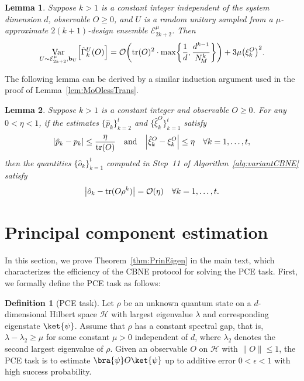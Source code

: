 \documentclass[aps,prl,twocolumn,nofootinbib,superscriptaddress,10pt]{revtex4-2}
\let\originalleft\left
\let\originalright\right
\renewcommand{\left}{\mathopen{}\mathclose\bgroup\originalleft}
\renewcommand{\right}{\aftergroup\egroup\originalright}
\DeclareMathOperator{\Var}{Var}
\DeclareMathOperator{\Tr}{tr}
\newcommand{\bigo}[1]{\mathcal{O}\left(#1\right)}
\theoremstyle{plain}
\newtheorem{lemma}{Lemma}
\theoremstyle{definition}
\newtheorem{defn}{Definition}
\newcommand{\caH}{\mathcal{H}}
\newcommand{\eref}[1]{Eq.~\textup{(\ref{#1})}}
\newcommand{\lref}[1]{Lemma~\ref{#1}}
\newcommand{\tref}[1]{Theorem~\ref{#1}}
\begin{document}
\begin{lemma}\label{lem:GammakVarianceApp}
Suppose $k>1$ is a constant integer independent of the system dimension $d$, 
observable $O\geq 0$, and $U$ is a random unitary  sampled from a 
$\mu$-approximate $2(k+1)$-design ensemble $\mathcal E_{2k+2}^\mu$. Then 
\begin{align}
\underset{U\sim \mathcal E_{2k+2}^\mu,\mathbf{b}_{U}}{\Var}
\left[\hat{\Gamma}_k^U (O)\right] 
= \bigo{\Tr(O)^2 \cdot \max\left\lbrace \frac{1}{d} ,\frac{d^{k-1}}{N_{\!M}^{k}}\right\rbrace} 
+ 3\mu \left( \xi_k^{O}\right) ^2. 
\end{align}
\end{lemma}

The following lemma can be derived by a similar induction argument used in the proof of \lref{lem:MoOlessTrans}. 


\begin{lemma}\label{lem:MoOestTrans}
Suppose $k>1$ is a constant integer and observable $O\geq 0$. 
For any $0<\eta<1$, if the estimates $\{\hat{p}_k\}_{k=2}^t$ and $\{\hat{\xi}_k^O\}_{k=1}^t$ satisfy 
\begin{align}
|\hat{p}_k - p_k| \leq \frac{\eta}{\Tr(O)} 
\quad \text{and} \quad 
\left| \hat{\xi}_k^O - \xi_k^O\right|  \leq \eta
\quad \forall k = 1, \dots, t, 
\end{align} 
then the quantities $\{\hat{o}_k\}_{k=1}^t$ computed in Step~11 of Algorithm~\ref{alg:variantCBNE} satisfy
\begin{align}
	\left|\hat{o}_k-\Tr(O\rho^k)\right|  = \mathcal{O}(\eta)  
	\quad \forall k = 1, \dots, t.  
\end{align} 
\end{lemma}






\section{Principal component estimation}\label{sec:PCE}

In this section, we prove \tref{thm:PrinEigen} in the main text, 
which characterizes the efficiency of the CBNE protocol for solving the PCE task. 
First, we formally define the PCE task as follows:
\begin{defn}[PCE task]\label{defn:PCEtask}
    	Let $\rho$ be an unknown quantum state on a $d$-dimensional Hilbert space $\caH$ with largest eigenvalue $\lambda$
	and corresponding eigenstate $\ket{\psi}$.
	Assume that $\rho$ has a constant spectral gap, that is, $\lambda-\lambda_2\ge \mu$ for some constant $\mu>0$
	independent of $d$, where $\lambda_2$ denotes the second largest eigenvalue of $\rho$.
	Given an observable $O$ on $\caH$ with $\|O\|\leq 1$,
	the PCE task is to estimate $\bra{\psi}O\ket{\psi}$ up to additive error $0<\epsilon<1$
	with high success probability.
\end{defn}
\end{document}
